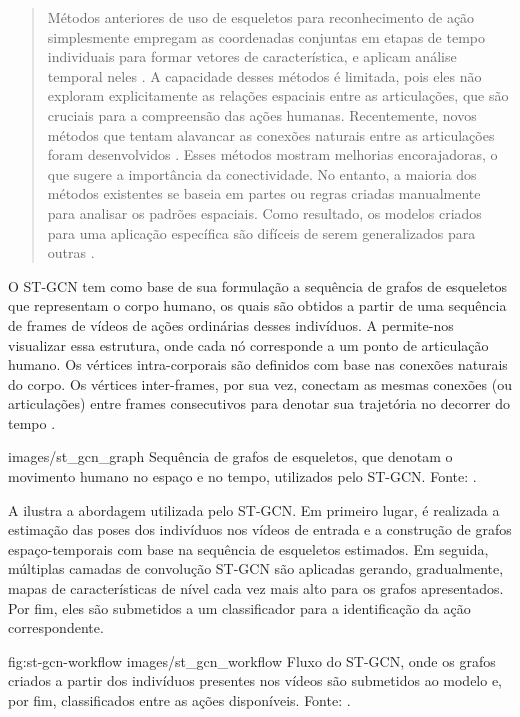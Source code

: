 \begin{quote}
Métodos anteriores de uso de esqueletos para reconhecimento de ação simplesmente empregam as coordenadas conjuntas em etapas de tempo individuais para formar vetores de característica, e aplicam análise temporal neles \cite{wang-2012, fernando-2015}. A capacidade desses métodos é limitada, pois eles não exploram explicitamente as relações espaciais entre as articulações, que são cruciais para a compreensão das ações humanas. Recentemente, novos métodos que tentam alavancar as conexões naturais entre as articulações foram desenvolvidos \cite{shahroudy-2016, yong-du-2015}. Esses métodos mostram melhorias encorajadoras, o que sugere a importância da conectividade. No entanto, a maioria dos métodos existentes se baseia em partes ou regras criadas manualmente para analisar os padrões espaciais. Como resultado, os modelos criados para uma aplicação específica são difíceis de serem generalizados para outras \cite{st-gcn-2018}.
\end{quote}

O ST-GCN tem como base de sua formulação a sequência de grafos de esqueletos que representam o corpo humano, os quais são obtidos a partir de uma sequência de frames de vídeos de ações ordinárias desses indivíduos. A  permite-nos visualizar essa estrutura, onde cada nó corresponde a um ponto de articulação humano. Os vértices intra-corporais são definidos com base nas conexões naturais do corpo. Os vértices inter-frames, por sua vez, conectam as mesmas conexões (ou articulações) entre frames consecutivos para denotar sua trajetória no decorrer do tempo \cite{st-gcn-2018}.

    {images/st_gcn_graph}
    {Sequência de grafos de esqueletos, que denotam o movimento humano no espaço e no tempo, utilizados pelo ST-GCN. Fonte: \cite[p. 1]{st-gcn-2018}.}

A  ilustra a abordagem utilizada pelo ST-GCN. Em primeiro lugar, é realizada a estimação das poses dos indivíduos nos vídeos de entrada e a construção de grafos espaço-temporais com base na sequência de esqueletos estimados. Em seguida, múltiplas camadas de convolução ST-GCN são aplicadas gerando, gradualmente, mapas de características de nível cada vez mais alto para os grafos apresentados. Por fim, eles são submetidos a um classificador para a identificação da ação correspondente.

\image
    {fig:st-gcn-workflow}
    {images/st_gcn_workflow}
    {Fluxo do ST-GCN, onde os grafos criados a partir dos indivíduos presentes nos vídeos são submetidos ao modelo e, por fim, classificados entre as ações disponíveis. Fonte: \cite[p. 3]{st-gcn-2018}.}

